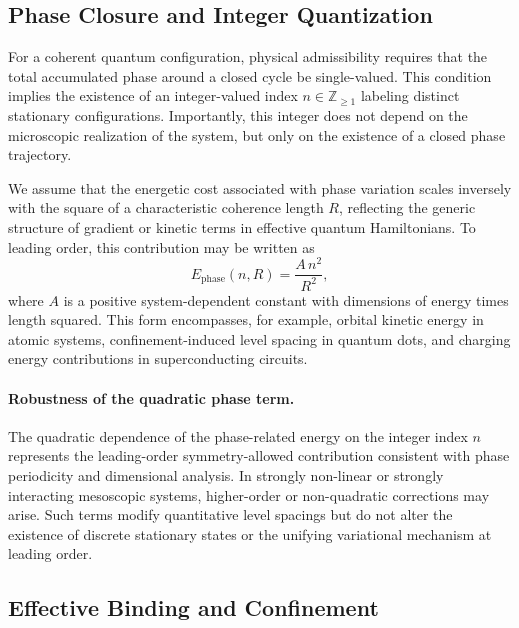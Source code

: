 \documentclass[11pt]{article}
\begin{document}
        \subsection{Phase Closure and Integer Quantization}

            For a coherent quantum configuration, physical admissibility requires that the total accumulated phase around a closed cycle be single-valued. This condition implies the existence of an integer-valued index $n\in\mathbb{Z}_{\geq 1}$ labeling distinct stationary configurations. Importantly, this integer does not depend on the microscopic realization of the system, but only on the existence of a closed phase trajectory.

            We assume that the energetic cost associated with phase variation scales inversely with the square of a characteristic coherence length $R$, reflecting the generic structure of gradient or kinetic terms in effective quantum Hamiltonians. To leading order, this contribution may be written as
            \begin{equation}
                E_{\mathrm{phase}}(n,R)=\frac{A\,n^2}{R^2},
            \end{equation}
            where $A$ is a positive system-dependent constant with dimensions of energy times length squared. This form encompasses, for example, orbital kinetic energy in atomic systems, confinement-induced level spacing in quantum dots, and charging energy contributions in superconducting circuits.

            \paragraph{Robustness of the quadratic phase term.}
            The quadratic dependence of the phase-related energy on the integer index
            $n$ represents the leading-order symmetry-allowed contribution consistent
            with phase periodicity and dimensional analysis. In strongly non-linear
            or strongly interacting mesoscopic systems, higher-order or non-quadratic
            corrections may arise. Such terms modify quantitative level spacings but
            do not alter the existence of discrete stationary states or the unifying
            variational mechanism at leading order.

        \subsection{Effective Binding and Confinement}
\end{document}
